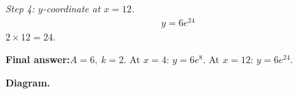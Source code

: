 \documentclass[11pt]{article}
\begin{document}
\textit{Step 4: \( y \)-coordinate at \( x = 12 \).}
\[\begin{gathered}
y = 6e^{24}
\end{gathered}\]
\( 2 \times 12 = 24 \).

\begin{answerbox}
\textbf{Final answer:}\quad \(\displaystyle  A = 6,\ k = 2 \). At \(\displaystyle  x = 4 \): \(\displaystyle  y = 6e^8 \). At \(\displaystyle  x = 12 \): \(\displaystyle  y = 6e^{24} \).
\end{answerbox}
\textbf{Diagram.}

\begin{center}
\end{center}
\end{document}
